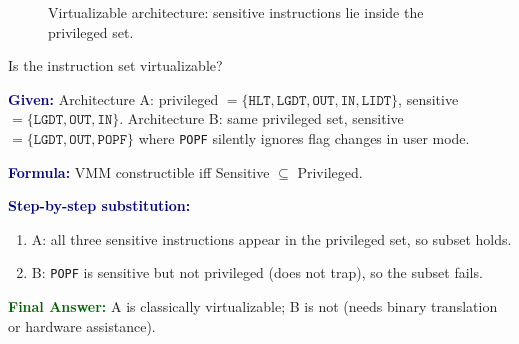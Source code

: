 \documentclass[11pt,a4paper,openany]{report}
\newcommand{\Given}{\par\textbf{\textcolor{navy}{Given:}} }
\newcommand{\Formula}{\par\textbf{\textcolor{navy}{Formula:}} }
\newcommand{\Steps}{\par\textbf{\textcolor{navy}{Step-by-step substitution:}}\par}
\newcommand{\Answer}{\par\textbf{\textcolor{darkgreen}{Final Answer:}} }
\begin{document}
\begin{figure}[H]
\centering
{}
\caption{Virtualizable architecture: sensitive instructions lie inside the privileged set.}
\end{figure}

\begin{solved}{Is the instruction set virtualizable?}
\Given Architecture A: privileged $=\{\texttt{HLT},\texttt{LGDT},\texttt{OUT},\texttt{IN},\texttt{LIDT}\}$, sensitive $=\{\texttt{LGDT},\texttt{OUT},\texttt{IN}\}$.
Architecture B: same privileged set, sensitive $=\{\texttt{LGDT},\texttt{OUT},\texttt{POPF}\}$ where \texttt{POPF} silently ignores flag changes in user mode.
\Formula VMM constructible iff Sensitive $\subseteq$ Privileged.
\Steps
\begin{enumerate}[leftmargin=*]
  \item A: all three sensitive instructions appear in the privileged set, so subset holds.
  \item B: \texttt{POPF} is sensitive but not privileged (does not trap), so the subset fails.
\end{enumerate}
\Answer A is classically virtualizable; B is not (needs binary translation or hardware assistance).
\end{solved}
\end{document}
